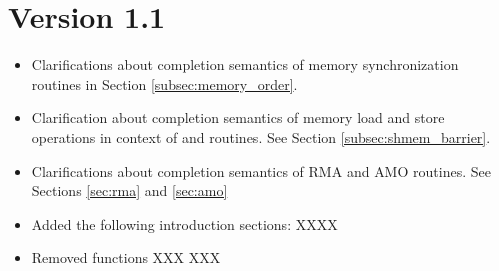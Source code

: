 \section{Version 1.1}
\begin{itemize}
\item Clarifications about completion semantics of memory synchronization 
routines in Section \ref{subsec:memory_order}.
\item Clarification about completion semantics of memory load and store 
operations in context of  and 
routines. See Section \ref{subsec:shmem_barrier}.
\item Clarifications about completion semantics of \ac{RMA} and \ac{AMO} routines.
See Sections \ref{sec:rma} and \ref{sec:amo}
\item Added the following introduction sections: XXXX
\item Removed functions XXX XXX
\end{itemize}
